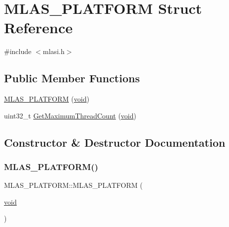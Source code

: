 \hypertarget{structMLAS__PLATFORM}{}\section{M\+L\+A\+S\+\_\+\+P\+L\+A\+T\+F\+O\+RM Struct Reference}
\label{structMLAS__PLATFORM}


{\ttfamily \#include $<$mlasi.\+h$>$}

\subsection*{Public Member Functions}
\begin{DoxyCompactItemize}
\item 
\mbox{\hyperlink{structMLAS__PLATFORM_aac60e906f65935b4c1baf766eba39166}{M\+L\+A\+S\+\_\+\+P\+L\+A\+T\+F\+O\+RM}} (\mbox{\hyperlink{mlasi_8h_a88f941d423cb2a819b70a1358982b1a6}{void}})
\item 
uint32\+\_\+t \mbox{\hyperlink{structMLAS__PLATFORM_aaba770e9940e1057a26a65edc523df85}{Get\+Maximum\+Thread\+Count}} (\mbox{\hyperlink{mlasi_8h_a88f941d423cb2a819b70a1358982b1a6}{void}})
\end{DoxyCompactItemize}


\subsection{Constructor \& Destructor Documentation}
\mbox{\label{structMLAS__PLATFORM_aac60e906f65935b4c1baf766eba39166}} 
\subsubsection{\texorpdfstring{M\+L\+A\+S\+\_\+\+P\+L\+A\+T\+F\+O\+R\+M()}{MLAS\_PLATFORM()}}
{\footnotesize\ttfamily M\+L\+A\+S\+\_\+\+P\+L\+A\+T\+F\+O\+R\+M\+::\+M\+L\+A\+S\+\_\+\+P\+L\+A\+T\+F\+O\+RM (\begin{DoxyParamCaption}\item[{\mbox{\hyperlink{mlasi_8h_a88f941d423cb2a819b70a1358982b1a6}{void}}}]{ }\end{DoxyParamCaption})}



